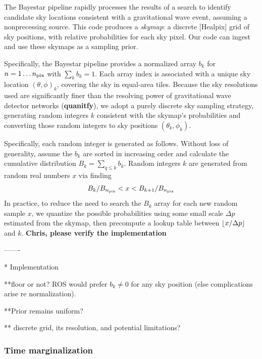 \documentclass[twocolumn,prd,nofootinbib]{revtex4}
\newcommand\editremark[1]{{\color{red} #1}}
\DeclarePairedDelimiter\floor{\lfloor}{\rfloor}
\newcommand\BS{{\sc Bayestar}}
\begin{document}
The \BS{} pipeline \cite{gw-astro-Bayestar} rapidly processes the results of a search to identify candidate sky
locations consistent with a gravitational wave event, assuming a nonprecessing source.   
%
This code produces a \emph{skymap}: a discrete [Healpix] grid of sky positions, with relative probabilities for each sky
pixel.  
%
Our code can ingest and use these skymaps as a sampling prior.

Specifically, the \BS{} pipeline provides a normalized array  $b_k$  for $n=1\ldots n_{\rm pix}$ with $\sum_k b_k=1$.    
Each array index is associated with a unique sky location $(\theta,\phi)_k $, covering the sky in equal-area tiles.
%
Because the sky resolutions used are  significantly finer than the resolving power of gravitational wave detector networks
(\textbf{quanitfy}), we adopt a purely discrete sky sampling strategy, generating random integers $k$ consistent with
the skymap's probabilities and converting those random integers to sky positions $(\theta_k,\phi_k)$.  



Specifically, each random integer is generated as follows. 
%
Without loss of generality, assume the $b_k$ are sorted in increasing order and calculate the cumulative distribution $B_k
= \sum_{q\le k} b_k$.   Random integers $k$ are generated from random real numbers $x$ via finding
\begin{eqnarray}
 B_k/B_{n_{\rm pix}} < x <  B_{k+1}/B_{n_{\rm pix}}
\end{eqnarray}
In practice, to reduce the need to search the $B_k$ array for each new random sample $x$, we quantize the possible probabilities
using some small scale $\Delta p$ estimated from the skymap, then  precompute a lookup table between $\floor*{x/\Delta
  p}$ and $k$.    \textbf{Chris, please verify the implementation}




-------

*  \editremark{Implementation}

**floor or not? ROS would prefer $b_k \ne 0$ for any sky position (else complications arise re normalization).

**Prior remains uniform?

**  discrete grid, its resolution, and potential limitations?

\subsubsection{Time marginalization}
\end{document}
